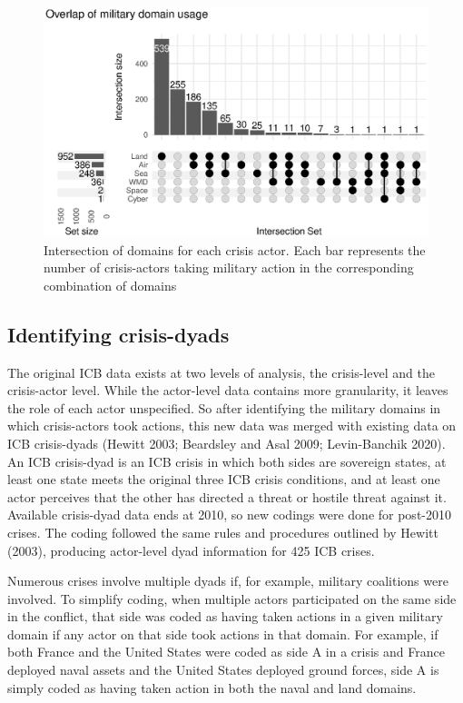 \documentclass[
]{article}
\begin{document}
\begin{figure}[h!]

{\centering \includegraphics{2022-05-03_ICB-Domains_files/figure-latex/fig-1-1} 

}

\caption{Intersection of domains for each crisis actor. Each bar represents the number of crisis-actors taking military action in the corresponding combination of domains}\label{fig:fig-1}
\end{figure}

\hypertarget{identifying-crisis-dyads}{%
\subsection{Identifying crisis-dyads}\label{identifying-crisis-dyads}}

The original ICB data exists at two levels of analysis, the crisis-level and the crisis-actor level. While the actor-level data contains more granularity, it leaves the role of each actor unspecified. So after identifying the military domains in which crisis-actors took actions, this new data was merged with existing data on ICB crisis-dyads (Hewitt 2003; Beardsley and Asal 2009; Levin-Banchik 2020). An ICB crisis-dyad is an ICB crisis in which both sides are sovereign states, at least one state meets the original three ICB crisis conditions, and at least one actor perceives that the other has directed a threat or hostile threat against it. Available crisis-dyad data ends at 2010, so new codings were done for post-2010 crises. The coding followed the same rules and procedures outlined by Hewitt (2003), producing actor-level dyad information for 425 ICB crises.

Numerous crises involve multiple dyads if, for example, military coalitions were involved. To simplify coding, when multiple actors participated on the same side in the conflict, that side was coded as having taken actions in a given military domain if any actor on that side took actions in that domain. For example, if both France and the United States were coded as side A in a crisis and France deployed naval assets and the United States deployed ground forces, side A is simply coded as having taken action in both the naval and land domains.
\end{document}
